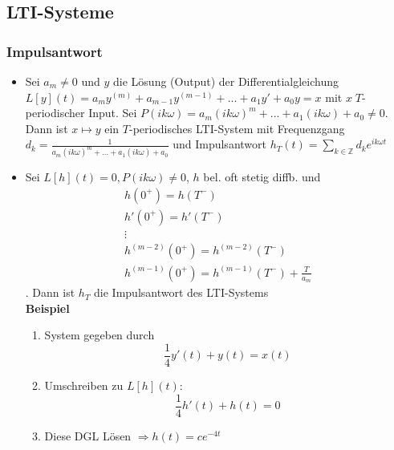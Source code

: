 \subsection{LTI-Systeme}
\begin{sectionbox}
    \subsubsection{Impulsantwort}
    \begin{itemize}
        \item Sei $a_m\ne 0$ und $y$ die Lösung (Output) der Differentialgleichung $L[y](t) = a_my^{(m)} + a_{m-1}y^{(m-1)}+...+a_1y'+a_0y=x$ mit $x \; T$-periodischer Input.
              Sei $P(ik\omega) = a_m(ik\omega)^m + ... + a_1(ik\omega) + a_0\ne 0$.
              Dann ist $x \mapsto y$ ein $T$-periodisches LTI-System mit Frequenzgang $d_k=\frac{1}{a_m(ik\omega)^m + ... + a_1(ik\omega) + a_0}$ und Impulsantwort $h_T(t)=\sum_{k\in\mathbb Z} d_ke^{ik\omega t}$
        \item Sei $L[h](t) = 0, P(ik\omega) \ne 0$, $h$ bel. oft stetig diffb. und \begin{align*}
                  h(0^+) = h(T^-)                 \\
                  h'(0^+) = h'(T^-)               \\
                  \vdots                          \\
                  h^{(m-2)}(0^+) = h^{(m-2)}(T^-) \\
                  h^{(m-1)}(0^+) = h^{(m-1)}(T^-) + \frac{T}{a_m}
              \end{align*}. Dann ist $h_T$ die Impulsantwort des LTI-Systems \\
              \textbf{Beispiel} \\
              \begin{enumerate}
                  \item System gegeben durch \begin{equation*}
                            \frac{1}{4}y'(t) + y(t) = x(t)
                        \end{equation*}
                  \item Umschreiben zu $L[h](t)$: \begin{equation*}
                            \frac{1}{4}h'(t) + h(t) = 0
                        \end{equation*}
                  \item Diese DGL Lösen $\Rightarrow h(t) = ce^{-4t}$

\end{enumerate}
\end{itemize}
\end{sectionbox}
